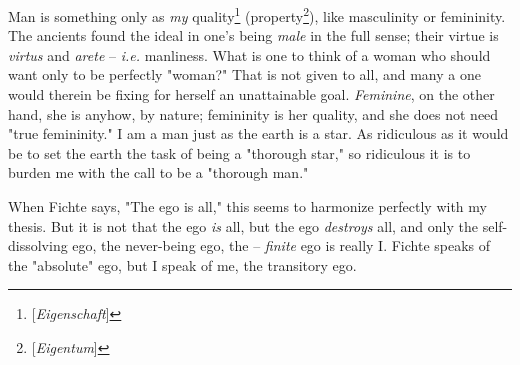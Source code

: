Man is something only as \textit{my} quality\footnote{[\textit{Eigenschaft}]} 
(property\footnote{[\textit{Eigentum}]}), like masculinity or femininity. The 
ancients found the ideal in one's being \textit{male} in the full sense; their 
virtue is \textit{virtus} and \textit{arete} -- \textit{i.e.} manliness. What 
is one to think of a woman who should want only to be perfectly "{}woman?"{} 
That is not given to all, and many a one would therein be fixing for herself 
an unattainable goal. \textit{Feminine}, on the other hand, she is anyhow, by 
nature; femininity is her quality, and she does not need "{}true 
femininity."{} I am a man just as the earth is a star. As ridiculous as it 
would be to set the earth the task of being a "{}thorough star,"{} so 
ridiculous it is to burden me with the call to be a "{}thorough man."{}

When Fichte says, "{}The ego is all,"{} this seems to harmonize perfectly with 
my thesis. But it is not that the ego \textit{is} all, but the ego 
\textit{destroys} all, and only the self-dissolving ego, the never-being ego, 
the -- \textit{finite} ego is really I. Fichte speaks of the "{}absolute"{} 
ego, but I speak of me, the transitory ego.

